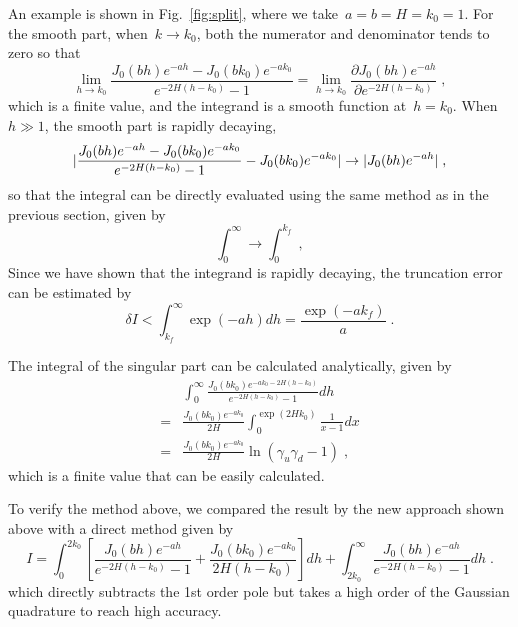 An example is shown in Fig.~\ref{fig:split}, where we take~$a = b = H = k_0 = 1$.
For the smooth part, when~$k \to k_0$, both the numerator and denominator tends to zero so that
\begin{equation}
    \lim_{h \to k_0} \frac{J_0(bh) e^{- a h} - J_0(bk_0) e^{- a k_0}}{e^{- 2 H (h - k_0)} - 1}  = \lim_{h \to k_0} \frac{ \partial {J_0(bh) e^{- a h}}}{ \partial {e^{- 2 H (h - k_0)}}}\;,
\end{equation}
which is a finite value, and the integrand is a smooth function at~$h = k_0$.
When~$h \gg 1$, the smooth part is rapidly decaying, 
\begin{equation}
    \lvert\frac{J_0(bh) e^{- a h} - J_0(bk_0) e^{- a k_0}}{e^{- 2 H (h - k_0)} - 1} - J_0(bk_0) e^{- a k_0} \rvert \to \lvert J_0(bh) e^{- a h}\rvert\;,
\end{equation}
so that the integral can be directly evaluated using the same method as in the previous section, given by
\begin{equation}
    \int_0^{\infty} \to \int_0^{k_f}\;,
\end{equation}
Since we have shown that the integrand is rapidly decaying, the truncation error can be estimated by
\begin{equation}
    \delta I < \int_{k_f}^{\infty} \exp{(-a h)} dh = \frac{\exp{(-a k_f)}}{a}\;.
\end{equation}

The integral of the singular part can be calculated analytically, given by
\begin{equation}
    \begin{split}
        & \int_0^{\infty} \frac{J_0(bk_0) e^{- a k_0 - 2 H (h - k_0)}}{e^{- 2 H (h - k_0)} - 1} dh\\
        = & \frac{J_0(bk_0) e^{- a k_0}}{2H} \int_{0}^{\exp{(2 H k_0)}} \frac{1}{x - 1} dx\\
        = & \frac{J_0(bk_0) e^{- a k_0}}{2H} \ln{(\gamma_u \gamma_d - 1)}\;,
    \end{split}
\end{equation}
which is a finite value that can be easily calculated.

To verify the method above, we compared the result by the new approach shown above with a direct method given by
\begin{equation}
        I = \int_{0}^{2 k_0} \left[\frac{J_0(bh)e^{-ah}}{e^{-2H(h-k_0)} - 1} + \frac{J_0(bk_0)e^{-ak_0}}{2H(h - k_0)}\right] dh + \int_{2 k_0}^{\infty} \frac{J_0(bh)e^{-ah}}{e^{-2H(h-k_0)} - 1} dh\;.\label{eq:direct}
\end{equation}
which directly subtracts the 1st order pole but takes a high order of the Gaussian quadrature to reach high accuracy.

